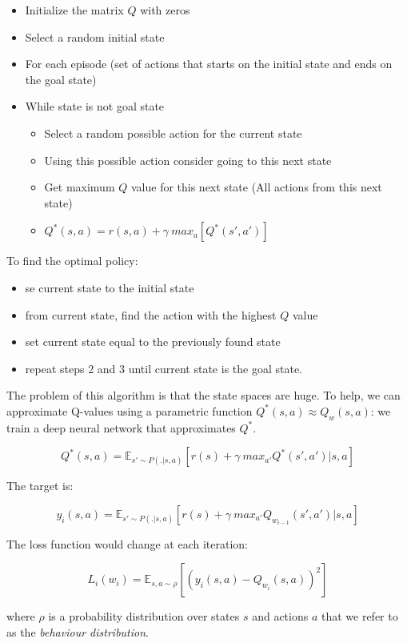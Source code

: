 \documentclass{article}
\begin{document}
\begin{itemize}
\tightlist
\item
  Initialize the matrix \(Q\) with zeros
\item
  Select a random initial state
\item
  For each episode (set of actions that starts on the initial state and
  ends on the goal state)
\item
  While state is not goal state

  \begin{itemize}
  \tightlist
  \item
    Select a random possible action for the current state
  \item
    Using this possible action consider going to this next state
  \item
    Get maximum \(Q\) value for this next state (All actions from this
    next state)
  \item
    \(Q^*(s, a)=r(s, a)+\gamma\ max_a[Q^*(s', a')]\)
  \end{itemize}
\end{itemize}

To find the optimal policy:

\begin{itemize}
\tightlist
\item
  se current state to the initial state
\item
  from current state, find the action with the highest \(Q\) value
\item
  set current state equal to the previously found state
\item
  repeat steps 2 and 3 until current state is the goal state.
\end{itemize}

The problem of this algorithm is that the state spaces are huge. To
help, we can approximate Q-values using a parametric function
\(Q^*(s, a)\approx Q_w(s, a)\): we train a deep neural network that
approximates \(Q^*\).

\[Q^*(s,a)=\mathbb{E}_{s'\sim P(.|s, a)}[r(s)+\gamma\ max_{a'}Q^*(s', a')|s, a]\]

The target is:

\[y_i(s, a)=\mathbb{E}_{s'\sim P(.|s, a)}[r(s)+\gamma\ max_{a'}Q_{w_{i-1}}(s', a')|s, a]\]

The loss function would change at each iteration:

\[L_i(w_i)=\mathbb{E}_{s, a\sim \rho}[(y_i(s, a)-Q_{w_i}(s, a))^2]\]

where \(\rho\) is a probability distribution over states \(s\) and
actions \(a\) that we refer to as the \emph{behaviour distribution}.
\end{document}
